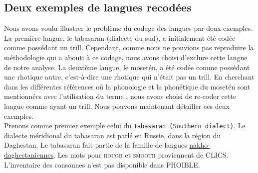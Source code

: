 
\subsection{Deux exemples de langues recodées}

Nous avons voulu illustrer le problème du codage des langues par deux exemples. La première langue, le tabasaran (dialecte du sud), a initialement été codée comme possédant un trill. Cependant, comme nous ne pouvions pas reproduire la méthodologie qui a abouti à ce codage, nous avons choisi d'exclure cette langue de notre analyse. La deuxième langue, le mosetén, a été codée comme possédant une rhotique autre, c'est-à-dire une rhotique qui n'était pas un trill. En cherchant dans les différentes références où la phonologie et la phonétique du mosetén sont mentionnées avec l'utilisation du terme , nous avons choisi de re-coder cette langue comme ayant un trill. Nous pouvons maintenant détailler ces deux exemples.\\

Prenons comme premier exemple celui du \texttt{Tabasaran (Southern dialect)}. Le dialecte méridional du tabasaran est parlé en Russie, dans la région du Daghestan. Le tabasaran fait partie de la famille de langues  \href{https://glottolog.org/resource/languoid/id/nakh1245}{nakho-daghestaniennes}. Les mots pour \textsc{rough} et \textsc{smooth} proviennent de CLICS. L'inventaire des consonnes n'est pas disponible dans PHOIBLE.

